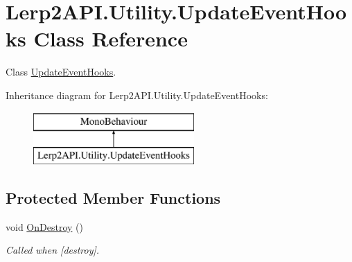 \hypertarget{class_lerp2_a_p_i_1_1_utility_1_1_update_event_hooks}{}\section{Lerp2\+A\+P\+I.\+Utility.\+Update\+Event\+Hooks Class Reference}
\label{class_lerp2_a_p_i_1_1_utility_1_1_update_event_hooks}


Class \hyperlink{class_lerp2_a_p_i_1_1_utility_1_1_update_event_hooks}{Update\+Event\+Hooks}.  


Inheritance diagram for Lerp2\+A\+P\+I.\+Utility.\+Update\+Event\+Hooks\+:\begin{figure}[H]
\begin{center}
\leavevmode
\includegraphics[height=2.000000cm]{class_lerp2_a_p_i_1_1_utility_1_1_update_event_hooks}
\end{center}
\end{figure}
\subsection*{Protected Member Functions}
\begin{DoxyCompactItemize}
\item 
void \hyperlink{class_lerp2_a_p_i_1_1_utility_1_1_update_event_hooks_a8637b48cca300cd9ce624b7f66fbc971}{On\+Destroy} ()
\begin{DoxyCompactList}\small\item\em Called when \mbox{[}destroy\mbox{]}. \end{DoxyCompactList}\end{DoxyCompactItemize}
